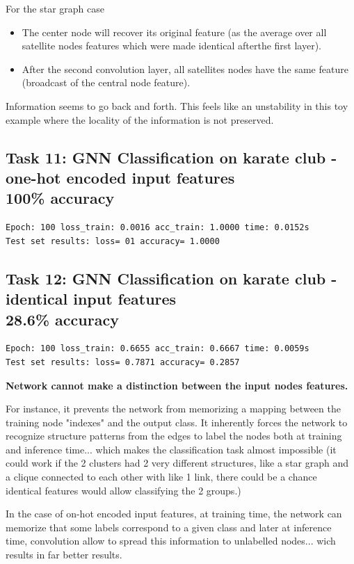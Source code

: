 \documentclass[a4paper]{article}
\begin{document}
For the star graph case
\begin{itemize}
    \item The center node will recover its original feature (as the average over all satellite nodes features which were made identical afterthe first layer).
    \item After the second convolution layer, all satellites nodes have the same feature (broadcast of the central node feature).
\end{itemize}
Information seems to go back and forth. This feels like an unstability in this toy example where the locality of the information is not preserved.


\subsection*{Task 11: GNN Classification on karate club - one-hot encoded input features \\ 100\% accuracy}
\begin{verbatim}
Epoch: 100 loss_train: 0.0016 acc_train: 1.0000 time: 0.0152s
Test set results: loss= 01 accuracy= 1.0000
\end{verbatim}

\subsection*{Task 12: GNN Classification on karate club - identical input features \\ 28.6\% accuracy}
\begin{verbatim}
Epoch: 100 loss_train: 0.6655 acc_train: 0.6667 time: 0.0059s
Test set results: loss= 0.7871 accuracy= 0.2857
\end{verbatim}  
\textbf{Network cannot make a distinction between the input nodes features.}

For instance, it prevents the network from memorizing a mapping between the training node "indexes" and the output class.
It inherently forces the network to recognize structure patterns from the edges to label the nodes both at training and inference time...
which makes the classification task almost impossible 
(it could work if the 2 clusters had 2 very different structures, like a star graph and a clique connected to each other with like 1 link,
there could be a chance identical features would allow classifying the 2 groups.)

In the case of on-hot encoded input features, at training time, the network can memorize that some labels correspond
to a given class and later at inference time, convolution allow to spread this information to unlabelled nodes...
wich results in far better results.
\end{document}
